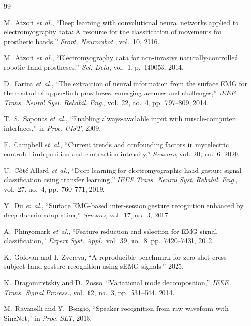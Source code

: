 \documentclass[conference]{IEEEtran}
\newcommand{\etal}{\mbox{\textit{et~al.}}}
\begin{document}
\begin{thebibliography}{99}

M.~Atzori \etal, ``Deep learning with convolutional neural networks applied to electromyography data: A resource for the classification of movements for prosthetic hands,'' \textit{Front. Neurorobot.}, vol.~10, 2016.

M.~Atzori \etal, ``Electromyography data for non-invasive naturally-controlled robotic hand prostheses,'' \textit{Sci. Data}, vol.~1, p.~140053, 2014.

D.~Farina \etal, ``The extraction of neural information from the surface EMG for the control of upper-limb prostheses: emerging avenues and challenges,'' \textit{IEEE Trans. Neural Syst. Rehabil. Eng.}, vol.~22, no.~4, pp.~797--809, 2014.

T.~S.~Saponas \etal, ``Enabling always-available input with muscle-computer interfaces,'' in \textit{Proc. UIST}, 2009.

E.~Campbell \etal, ``Current trends and confounding factors in myoelectric control: Limb position and contraction intensity,'' \textit{Sensors}, vol.~20, no.~6, 2020.

U.~C\^{o}t\'{e}-Allard \etal, ``Deep learning for electromyographic hand gesture signal classification using transfer learning,'' \textit{IEEE Trans. Neural Syst. Rehabil. Eng.}, vol.~27, no.~4, pp.~760--771, 2019.

Y.~Du \etal, ``Surface EMG-based inter-session gesture recognition enhanced by deep domain adaptation,'' \textit{Sensors}, vol.~17, no.~3, 2017.

A.~Phinyomark \etal, ``Feature reduction and selection for EMG signal classification,'' \textit{Expert Syst. Appl.}, vol.~39, no.~8, pp.~7420--7431, 2012.

K.~Golovan and I.~Zvereva, ``A reproducible benchmark for zero-shot cross-subject hand gesture recognition using sEMG signals,'' 2025.

K.~Dragomiretskiy and D.~Zosso, ``Variational mode decomposition,'' \textit{IEEE Trans. Signal Process.}, vol.~62, no.~3, pp.~531--544, 2014.

M.~Ravanelli and Y.~Bengio, ``Speaker recognition from raw waveform with SincNet,'' in \textit{Proc. SLT}, 2018.


\end{thebibliography}
\end{document}
